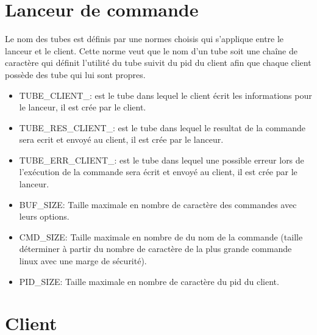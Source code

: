 \documentclass[12pt]{article}
\begin{document}
\section{Lanceur de commande}
Le nom des tubes est définis par une normes choisis qui s'applique
entre le lanceur et le client. Cette norme veut que le nom d'un tube soit une
chaîne de caractère qui
définit l'utilité du tube suivit du pid du client afin que chaque client
possède des tube qui lui sont propres.
\begin{itemize}
  \item TUBE\_CLIENT\_: est le tube dans lequel le client écrit les
        informations
        pour le lanceur, il est crée par le client.
  \item TUBE\_RES\_CLIENT\_: est le tube dans lequel le resultat de la commande
        sera ecrit et envoyé au client, il est crée par le lanceur.
  \item TUBE\_ERR\_CLIENT\_: est le tube dans lequel une possible erreur lors
        de l'exécution de la commande sera écrit et envoyé au client, il est
        crée par le lanceur.
  \item BUF\_SIZE: Taille maximale en nombre de caractère des commandes avec
        leurs options.
  \item CMD\_SIZE: Taille maximale en nombre de  du nom de la commande
        (taille déterminer à partir du nombre de caractère de la plus grande
        commande
        linux avec une marge de sécurité).
  \item PID\_SIZE: Taille maximale en nombre de caractère du pid du client.
\end{itemize}
\section{Client}
\end{document}
